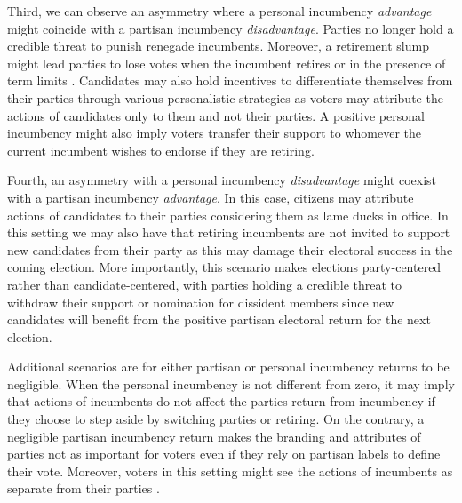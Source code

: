 \documentclass[12pt]{amsart}
\numberwithin{equation}{section}
\theoremstyle{definition}
\theoremstyle{definition}
\theoremstyle{definition}
\begin{document}
 Third, we can observe an asymmetry where a personal incumbency \emph{advantage} might coincide with a partisan incumbency \emph{disadvantage}. Parties no longer hold a credible threat to punish renegade incumbents. Moreover, a retirement slump might lead parties to lose votes when the incumbent retires \citep{alford_brady_1989} or in the presence of term limits \citep{ansolabehere_snyder_2004}. Candidates may also hold incentives to differentiate themselves from their parties through various personalistic strategies as voters may attribute the actions of candidates only to them and not their parties. A positive personal incumbency might also imply voters transfer their support to whomever the current incumbent wishes to endorse if they are retiring. 
  
 
 Fourth, an asymmetry with a personal incumbency \emph{disadvantage} might coexist with a partisan incumbency \emph{advantage}. In this case, citizens may attribute actions of candidates to their parties considering them as lame ducks in office. In this setting we may also have that retiring incumbents are not invited to support new candidates from their party as this may damage their electoral success in the coming election. More importantly, this scenario makes elections party-centered rather than candidate-centered, with parties holding a credible threat to withdraw their support or nomination for dissident members since new candidates will benefit from the positive partisan electoral return for the next election.  

Additional scenarios are for either partisan or personal incumbency returns to be negligible. When the personal incumbency is not different from zero, it may imply that actions of incumbents do not affect the parties return from incumbency if they choose to step aside by switching parties or retiring. On the contrary, a negligible partisan incumbency return makes the branding and attributes of parties not as important for voters even if they rely on partisan labels to define their vote. Moreover, voters in this setting might see the actions of incumbents as separate from their parties \citep{fowler_hall_2014}. 
\end{document}
